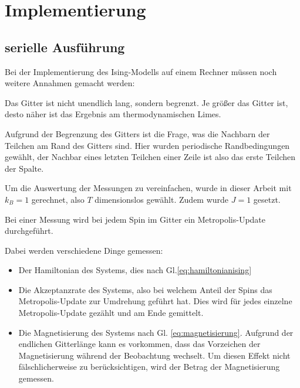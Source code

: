	\chapter{Implementierung}
	\label{chap:implementierung}
	
	\section{serielle Ausführung}
	\label{sec:seriellimplementierung}
	Bei der Implementierung des Ising-Modells auf einem Rechner müssen noch weitere Annahmen gemacht werden:
	
	Das Gitter ist nicht unendlich lang, sondern begrenzt. Je größer das Gitter ist, desto näher ist das Ergebnis am thermodynamischen Limes. 
	
	Aufgrund der Begrenzung des Gitters ist die Frage, was die Nachbarn der Teilchen am Rand des Gitters sind. Hier wurden periodische Randbedingungen gewählt, der Nachbar eines letzten Teilchen einer Zeile ist also das erste Teilchen der Spalte.
	
	Um die Auswertung der Messungen zu vereinfachen, wurde in dieser Arbeit mit $k_B=1$ gerechnet, also $T$ dimensionslos gewählt. Zudem wurde $J=1$ gesetzt.
	
	Bei einer Messung wird bei jedem Spin im Gitter ein Metropolis-Update durchgeführt.%
	
	Dabei werden verschiedene Dinge gemessen: \begin{itemize}
		\item Der Hamiltonian des Systems, dies nach Gl.\ref{eq:hamiltonianising}
		\item Die Akzeptanzrate des Systems, also bei welchem Anteil der Spins das Metropolis-Update zur Umdrehung geführt hat. Dies wird für jedes einzelne Metropolis-Update gezählt und am Ende gemittelt.
		\item Die Magnetisierung des Systems nach Gl. \ref{eq:magnetisierung}. Aufgrund der endlichen Gitterlänge kann es vorkommen, dass das Vorzeichen der Magnetisierung während der Beobachtung wechselt. Um diesen Effekt nicht fälschlicherweise zu berücksichtigen, wird der Betrag der Magnetisierung gemessen. \cite[vgl. ][Abschn. 2.3.3]{binderheermann}
	\end{itemize}
	

